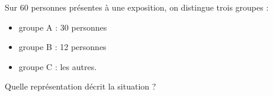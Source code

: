 
Sur 60 personnes présentes à une exposition, on distingue trois groupes :

\begin{itemize}
	\item groupe A : 30 personnes
	\item groupe B : 12 personnes
	\item groupe C : les autres.
\end{itemize}

Quelle représentation décrit la situation ?

\smallskip

%
{}%
{}%
{}
